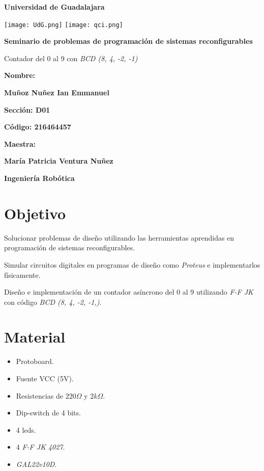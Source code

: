 \documentclass[12pt, oneside]{article}
\begin{document}
\begin{titlepage}
    \centering
    {\bfseries\LARGE Universidad de Guadalajara \par}
    \vfill
    {
        \texttt{[image: UdG.png]}
        \texttt{[image: qci.png]}
        \par
    }
    \vfill
    {\bfseries\LARGE Seminario de problemas de programación de sistemas reconfigurables \par}
    \vfill
    {\ttfamily\LARGE Contador del 0 al 9 con \emph{BCD (8, 4, -2, -1)} \par}
    \vfill
    {\bfseries\LARGE Nombre: \par}
    \vfill
    {\bfseries\LARGE Muñoz Nuñez Ian Emmanuel \par}
    \vfill
    {\bfseries\LARGE Sección: D01 \par}
    \vfill
    {\bfseries\LARGE Código: 216464457 \par}
    \vfill
    {\bfseries\LARGE Maestra: \par}
    \vfill
    {\bfseries\LARGE María Patricia Ventura Nuñez \par}
    \vfill
    {\bfseries\LARGE Ingeniería Robótica \par}
\end{titlepage}


\newpage
\section{Objetivo}
{\sffamily\large
    \hspace{0.5cm} Solucionar problemas de diseño utilizando las herramientas aprendidas
    en programación de sistemas reconfigurables.

    \hspace{0.5cm} Simular circuitos digitales en programas de diseño como
    \emph{Proteus\textregistered} e implementarlos físicamente.

    \hspace{0.5cm} Diseño e implementación de un contador asíncrono del 0 al 9 utilizando
    \emph{F-F JK} con código \emph{BCD (8, 4, -2, -1,)}.

}

\section{Material}
{\sffamily\large
    \renewcommand{\labelitemi}{$\bullet$}
    \begin{itemize}
        \item Protoboard.
        \item Fuente VCC (5V).
        \item Resistencias de $220\Omega$ y $2k\Omega$.
        \item Dip-switch de 4 bits.
        \item 4 leds.
        \item 4 \emph{F-F JK 4027}.
        \item \emph{GAL22v10D}.
    \end{itemize}
}
\end{document}
